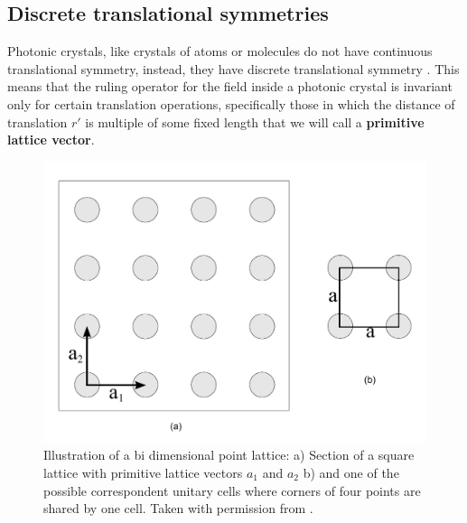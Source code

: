 \subsection{Discrete translational symmetries}
Photonic crystals, like crystals of atoms or molecules do not have continuous translational symmetry, instead, they have discrete translational symmetry \cite{Joannopoulos2008}. This means that the ruling operator for the field inside a photonic crystal is invariant only for certain translation operations, specifically those in which the distance of translation $r'$ is multiple of some fixed length that we will call a \textbf{primitive lattice vector}.

\begin{figure}
\centering
\includegraphics[scale=0.5]{./img/squarel.pdf}
\caption{Illustration of a bi dimensional point lattice: a) Section of a square lattice with primitive lattice vectors $a_1$ and $a_2$ b)  and one of the possible correspondent unitary cells where corners of four points are shared by one cell. Taken with permission from \cite{Guarin2012}.}
\label{fig:sq_lat_fig}
\end{figure}

